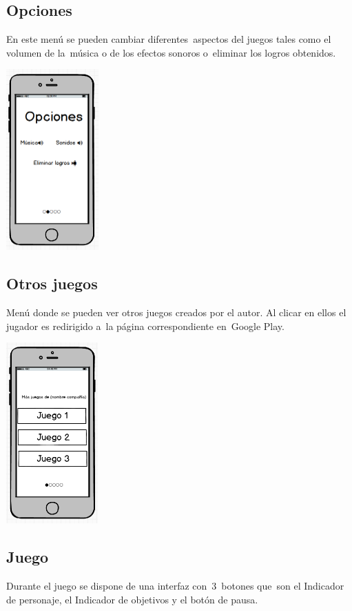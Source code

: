 \subsection[Opciones]{ Opciones}
\hypertarget{Toc484614219}{}{
En este men\'u se pueden cambiar diferentes\ aspectos del juegos tales como el volumen de la\ m\'usica o de los efectos
sonoros o\ eliminar los logros obtenidos.}

 \includegraphics[width=1.3923in,height=2.72745in]{anexos/GDD/GDD-img005.png} 

\subsection[Otros juegos]{ Otros juegos}
\hypertarget{Toc484614220}{}{
Men\'u donde se pueden ver otros juegos creados por el autor. Al clicar en ellos el jugador es redirigido a\ la p\'agina
correspondiente en\ Google Play.}

 \includegraphics[width=1.38953in,height=2.73205in]{anexos/GDD/GDD-img006.png} 

\subsection[Juego]{ Juego}
\hypertarget{Toc484614221}{}{
Durante el juego se dispone de una interfaz con\ 3\ botones que\ son el Indicador de personaje, el Indicador de
objetivos y el bot\'on de pausa.}

